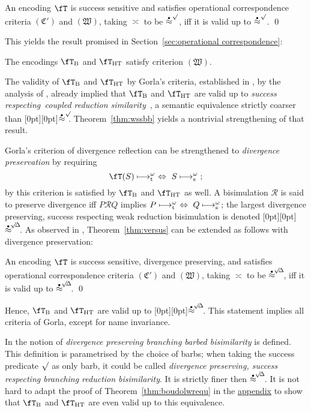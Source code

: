 \documentclass[runningheads]{llncs}
\newcommand{\thm}[1]{Theorem~\ref{thm:#1}}
\newcommand{\sect}[1]{Section~\ref{sec:#1}}
\newcommand{\fTHT}{\fT_{\textrm{HT}}}       %
\newcommand{\plat}[1]{\raisebox{0pt}[0pt][0pt]{#1}}     %
\newcommand{\trans}[1]{\fT(#1)}
\newcommand{\wbb}{\stackrel{\raisebox{-1pt}[0pt][0pt]{$\scriptscriptstyle \bullet$}}{\approx}}
\newcommand{\wssbb}{\wbb^\surd}
\newcommand{\wssbbd}{\wbb^{\!\surd\!\Delta}\!}
\newcommand{\mrel}{\ensuremath{\mathrel{\mathcal{R}}}}
\begin{document}
\begin{theorem}\rm\label{thm:versus}
  An encoding $\fT$ is success sensitive\vspace{-2pt} and satisfies operational correspondence criteria
  $(\mathfrak{C}')$ and $(\mathfrak{W})$, taking $\asymp$ to be $\wssbb$, iff it is valid up to $\wssbb$.
  \qed
\end{theorem}
This yields the result promised in \sect{operational correspondence}:
\begin{corollary}\rm
  The encodings $\fT_{\rm B}$ and $\fTHT$ satisfy criterion $(\mathfrak{W})$.
\end{corollary}
The validity of $\fT_{\rm B}$ and $\fTHT$ by Gorla's criteria, established in \cite{vG18a},
by the analysis of \cite{EPTCS190.4}, already implied that $\fT_{\rm B}$ and $\fTHT$ are valid up to
\emph{success respecting$\,$ coupled reduction similarity}~\cite{EPTCS190.4}, a semantic equivalence
strictly coarser than \plat{$\wssbb\!\!$}.\linebreak
\thm{wssbb} yields a nontrivial strengthening of that result.

Gorla's criterion of divergence reflection can be strengthened to \emph{divergence preservation}
by requiring\vspace{-2ex} $$\trans{S} \longmapsto_{\rm t}^\omega ~\Leftrightarrow~ S \longmapsto_{\rm s}^\omega\;;$$
by \cite[Remark 1]{vG18a} this criterion is satisfied by  $\fT_{\rm B}$ and $\fTHT$ as well.
A bisimulation $\mrel$ is said to preserve divergence iff $P\mathbin{\mrel} Q$ implies
$P \longmapsto_{\rm t}^\omega ~\Leftrightarrow~ Q \longmapsto_{\rm s}^\omega$;
the largest divergence preserving, success respecting weak reduction bisimulation is denoted \plat{$\wssbbd$}.
As observed in \cite{EPTCS190.4}, \thm{versus} can be extended as follows with divergence
preservation:
\begin{observation}\rm
  An encoding $\fT$ is success sensitive, divergence preserving,\vspace{-2pt} and satisfies operational correspondence criteria
  $(\mathfrak{C}')$ and $(\mathfrak{W})$, taking $\asymp$ to be $\wssbbd$,\vspace{-2pt} iff it is valid up to $\wssbbd$.
  \qed
\end{observation}
Hence, $\fT_{\rm B}$ and $\fTHT$ are valid up to \plat{$\wssbbd$}.
This statement implies all criteria of Gorla, except for name invariance.

In \cite[Definition~26]{vG18e} the notion of \emph{divergence preserving branching barbed bisimilarity} is defined.
This definition is parametrised by the choice of barbs; when taking the success predicate $\surd$ as
only barb, it could be called \emph{divergence preserving, success respecting branching reduction bisimilarity}.\vspace{-2pt}
It is strictly finer then $\wssbbd$. It is not hard to adapt the proof of \thm{boudolwrequ} in the
\hyperlink{appendix}{appendix} to show that $\fT_{\rm B}$ and $\fTHT$ are even valid up to this equivalence.
\end{document}
